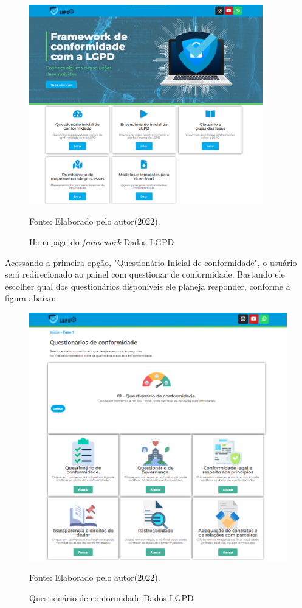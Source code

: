 \documentclass[
	12pt,				%
	openright,			%
	oneside,			%
	a4paper,			%
	english,			%
	french,				%
	spanish,			%
	brazil,				%
	]{abntex2}
\begin{document}
\begin{figure}[ht]
    \centering
    \caption{Homepage do \textit{framework} Dados LGPD}
    \includegraphics[width=4.0in]{Images/homepag.png}
    \label{fig: homepage}
    
    \centering \small Fonte: Elaborado pelo autor(2022).
\end{figure}

Acessando a primeira opção, "Questionário Inicial de conformidade", o usuário será redirecionado ao painel com questionar de conformidade. Bastando ele escolher qual dos questionários disponíveis ele planeja responder, conforme a figura abaixo:

\begin{figure}[ht]
    \centering
    \caption{Questionário de conformidade Dados LGPD}
    \includegraphics[width=6.6in]{Images/fase1.png}
    \label{fig: homepage}
    
    \centering \small Fonte: Elaborado pelo autor(2022).
\end{figure}
\end{document}
